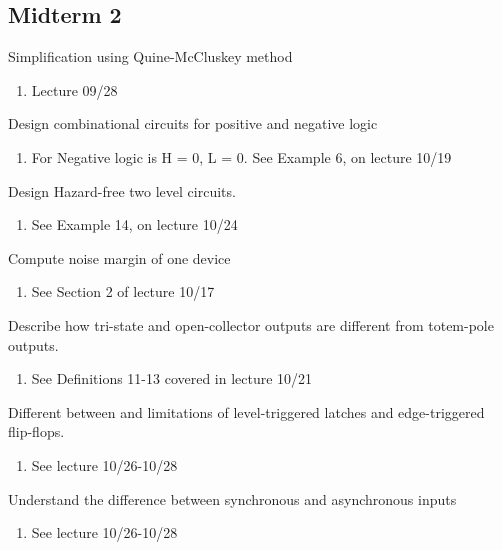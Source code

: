 \documentclass[options]{article}
\newcommand{\cmark}{\ding{51}}%
\newcommand{\done}{\rlap{$\square$}{\raisebox{2pt}{\large\hspace{1pt}\cmark}}%
  \hspace{-2.5pt}}
\begin{document}
\subsection{Midterm 2}
\begin{todolist}
  \item[\done]  Simplification using Quine-McCluskey method
    \begin{enumerate}
    \item Lecture 09/28 
    \end{enumerate}
  \item[\done]  Design combinational circuits for positive and negative logic
  \begin{enumerate}
    \item For Negative logic is H = 0, L = 0. See Example 6, on lecture 10/19
  \end{enumerate}
  \item[\done]  Design Hazard-free two level circuits.
  \begin{enumerate}
    \item See Example 14, on lecture 10/24
  \end{enumerate}
  \item[\done] Compute noise margin of one device
  \begin{enumerate}
    \item See Section 2 of lecture 10/17
   \end{enumerate}
  \item[\done] Describe how tri-state and open-collector outputs are different from totem-pole outputs.
    \begin{enumerate}
      \item See Definitions 11-13 covered in lecture 10/21
    \end{enumerate}
  \item[\done] Different between and limitations of level-triggered latches and edge-triggered flip-flops.
  \begin{enumerate}
    \item See lecture 10/26-10/28
  \end{enumerate}
\item[\done] Understand the difference between synchronous and asynchronous inputs
  \begin{enumerate}
  \item See lecture 10/26-10/28
  \end{enumerate}


\end{todolist}
\end{document}
